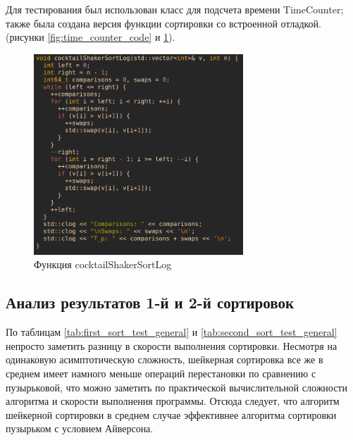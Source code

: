 \documentclass[a4paper, 14pt]{extarticle}
\begin{document}
Для тестирования был использован класс для подсчета времени TimeCounter;
также была создана версия функции сортировки со встроенной отладкой.
(рисунки \ref{fig:time_counter_code} и \ref{fig:second_sort_log}).
\begin{figure}[htpb]
  \centering
  \includegraphics[width=0.7\textwidth]{pictures/second_sort_log.png}
  \caption{Функция cocktailShakerSortLog}
  \label{fig:second_sort_log}
\end{figure}

\newpage
\subsection{Анализ результатов 1-й и 2-й сортировок}
По таблицам \ref{tab:first_sort_test_general} и \ref{tab:second_sort_test_general}
непросто заметить разницу в скорости выполнения
сортировки. Несмотря на одинаковую асимптотическую сложность, шейкерная
сортировка все же в среднем имеет намного меньше операций перестановки по
сравнению с пузырьковой,
что можно заметить по практической вычислительной сложности алгоритма
и скорости выполнения программы.
Отсюда следует, что алгоритм шейкерной сортировки в
среднем случае эффективнее алгоритма сортировки пузырьком с условием
Айверсона.
\newpage
\end{document}
